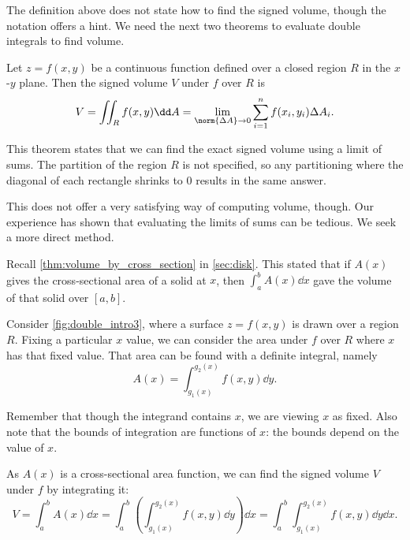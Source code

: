 The definition above does not state how to find the signed volume, though the notation offers a hint. We need the next two theorems to evaluate double integrals to find volume.

\begin{theorem}\label{thm:double_int}
Let $z=f(x,y)$ be a continuous function defined over a closed region $R$ in the $x$-$y$ plane. Then the signed volume $V$ under $f$ over $R$ is
\[V = \iint_R f(x,y)\dd A = \lim_{\norm{\Delta A}\to 0}\sum_{i=1}^n f(x_i,y_i)\Delta A_i.\]
\end{theorem}

This theorem states that we can find the exact signed volume using a limit of sums. The partition of the region $R$ is not specified, so any partitioning where the diagonal of each rectangle shrinks to 0 results in the same answer. 

This does not offer a very satisfying way of computing volume, though. Our experience has shown that evaluating the limits of sums can be tedious. We seek a more direct method.

Recall \autoref{thm:volume_by_cross_section} in \autoref{sec:disk}. This stated that if $A(x)$ gives the cross-sectional area of a solid at $x$, then $\int_a^b A(x)\dd x$ gave the volume of that solid over $[a,b]$. 

Consider \autoref{fig:double_intro3}, where a surface $z=f(x,y)$ is drawn over a region $R$. Fixing a particular $x$ value, we can consider the area under $f$ over $R$ where $x$ has that fixed value. That area can be found with a definite integral, namely
\[ A(x)=\int_{g_1(x)}^{g_2(x)} f(x,y)\dd y.\]

Remember that though the integrand contains $x$, we are viewing $x$ as fixed. Also note that the bounds of integration are functions of $x$: the bounds depend on the value of $x$. 


As $A(x)$ is a cross-sectional area function, we can find the signed volume $V$ under $f$ by integrating it:
\[
V = \int_a^b A(x)\dd x = \int_a^b\left(\int_{g_1(x)}^{g_2(x)} f(x,y)\dd y\right)\dd x
= \int_a^b\int_{g_1(x)}^{g_2(x)} f(x,y)\dd y\dd x.
\]

